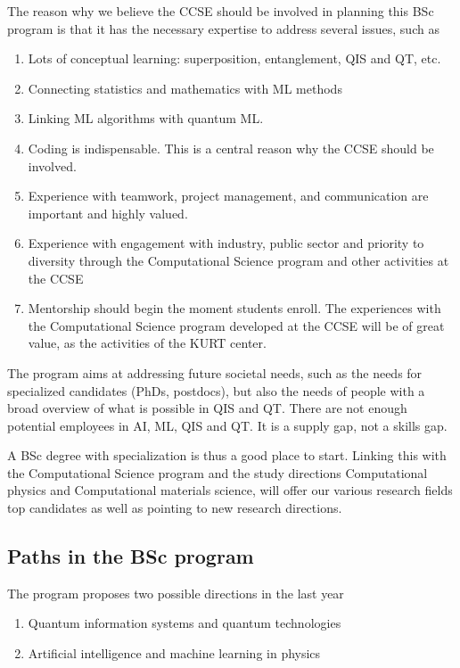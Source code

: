 \documentclass[aps,rmp,preprint,amsmath,amssymb,graphicx,longbibliography]{revtex4-1}
\begin{document}
The reason why we believe the CCSE should be involved in planning this BSc program is that it has the necessary expertise to address several issues, such as
\begin{enumerate}
    \item  Lots of conceptual learning: superposition, entanglement, QIS and QT, etc. 
    \item Connecting statistics and mathematics with ML methods
    \item Linking ML algorithms with quantum ML.
\item Coding is indispensable. This is a central reason why the CCSE should be involved.
\item Experience with teamwork, project management, and communication are important and highly valued.
\item  Experience with engagement with industry, public sector and priority to diversity through the Computational Science program and other activities at the CCSE
\item  Mentorship should begin the moment students enroll. The experiences with the Computational Science program developed at the CCSE will be of great value, as the activities of the KURT center.
\end{enumerate}

The program aims at addressing future societal needs, such as the  needs for specialized candidates (PhDs, postdocs), but also the needs of  people with a broad overview of what is possible in  QIS and QT. There are  not enough potential employees in AI, ML, QIS and QT. It is a supply gap, not a skills gap.

A BSc degree  with specialization  is thus a good place to start. Linking this with the Computational Science program and the study directions Computational physics and Computational materials science, will offer our various research fields top candidates as well as pointing to new research directions. 

\subsection{Paths in the BSc program}

The program proposes two possible directions in the last year
\begin{enumerate}
    \item Quantum information systems and quantum technologies
    \item Artificial intelligence and machine learning in physics
\end{enumerate}
\end{document}
